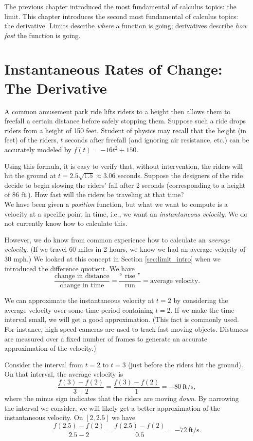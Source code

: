 The previous chapter introduced the most fundamental of calculus topics: the limit. This chapter introduces the second most fundamental of calculus topics: the derivative. Limits describe \textit{where} a function is going; derivatives describe \textit{how fast} the function is going.

\section{Instantaneous Rates of Change: The Derivative}\label{sec:derivative}

A common amusement park ride lifts riders to a height then allows them to freefall a certain distance before safely stopping them. Suppose such a ride drops riders from a height of 150 feet. Student of physics may recall that the height (in feet) of the riders, $t$ seconds after freefall (and ignoring air resistance, etc.) can be accurately modeled by $f(t) = -16t^2+150$. 

Using this formula, it is easy to verify that, without intervention, the riders will hit the ground at $t=2.5\sqrt{1.5} \approx 3.06$ seconds. Suppose the designers of the ride decide to begin slowing the riders' fall after 2 seconds (corresponding to a height of 86 ft.). How fast will the riders be traveling at that time?\\

We have been given a \textit{position} function, but what we want to compute is a velocity at a specific point in time, i.e., we want an \textit{instantaneous velocity}. We do not currently know how to calculate this.

However, we do know from common experience how to calculate an \textit{average velocity}. (If we travel 60 miles in 2 hours, we know we had an average velocity of 30 mph.) We looked at this concept in Section \ref{sec:limit_intro} when we introduced the difference quotient. We have 
	$$\frac{\text{change in distance}}{\text{change in time}} = \frac{\text{``\ rise\ ''}}{\text{run}} = \text{average velocity}.$$
	
We can approximate the instantaneous velocity at $t=2$ by considering the average velocity over some time period containing $t=2$. If we make the time interval small, we will get a good approximation. (This fact is commonly used. For instance, high speed cameras are used to track fast moving objects. Distances are measured over a fixed number of frames to generate an accurate approximation of the velocity.)

Consider the interval from $t=2$ to $t=3$ (just before the riders hit the ground). On that interval, the average velocity is 
		$$\frac{f(3)-f(2)}{3-2} = \frac{f(3)-f(2)}{1} =-80\ \text{ft/s},$$
where the minus sign indicates that the riders are moving \textit{down}. By narrowing the interval we consider, we will likely get a better approximation of the instantaneous velocity. On $[2,2.5]$ we have 
	$$\frac{f(2.5)-f(2)}{2.5-2} = \frac{f(2.5)-f(2)}{0.5} =-72\ \text{ft/s}.$$

